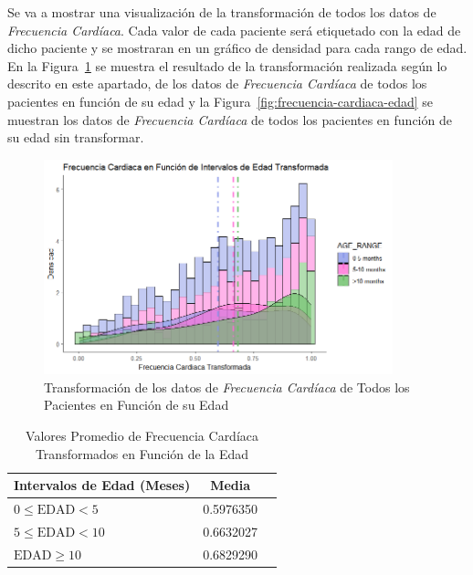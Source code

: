 Se va a mostrar una visualización de la transformación de todos los datos de \textit{Frecuencia Cardíaca}. Cada valor de cada paciente será etiquetado con la edad de dicho paciente y se mostraran en un gráfico de densidad para cada rango de edad. En la Figura~\ref{fig:transformacion-frecuencia-cardiaca-edad} se muestra el resultado de la transformación realizada según lo descrito en este apartado, de los datos de \textit{Frecuencia Cardíaca} de todos los pacientes en función de su edad y la Figura~\ref{fig:frecuencia-cardiaca-edad} se muestran los datos de \textit{Frecuencia Cardíaca} de todos los pacientes en función de su edad sin transformar.

\begin{figure}[H]
    \centering
    \includegraphics[width=0.9\textwidth]{img/transformacion-frecuencia-cardiaca-edad.png}
    \caption{Transformación de los datos de \textit{Frecuencia Cardíaca} de Todos los Pacientes en Función de su Edad}\label{fig:transformacion-frecuencia-cardiaca-edad}
\end{figure}

\begin{table}[H]
    \centering
    \begin{tabular}{lcc}
        \toprule
        \textbf{Intervalos de Edad (Meses)} & \textbf{Media} \\
        \midrule
        $0 \leq \text{EDAD} < 5$ & 0.5976350 \\
        $5 \leq \text{EDAD} < 10$ & 0.6632027 \\
        $\text{EDAD} \geq 10$ & 0.6829290 \\
        \bottomrule
    \end{tabular}
    \caption{Valores Promedio de Frecuencia Cardíaca Transformados en Función de la Edad}\label{tabla:frecuencia-cardiaca-edad-transformada}
\end{table}

